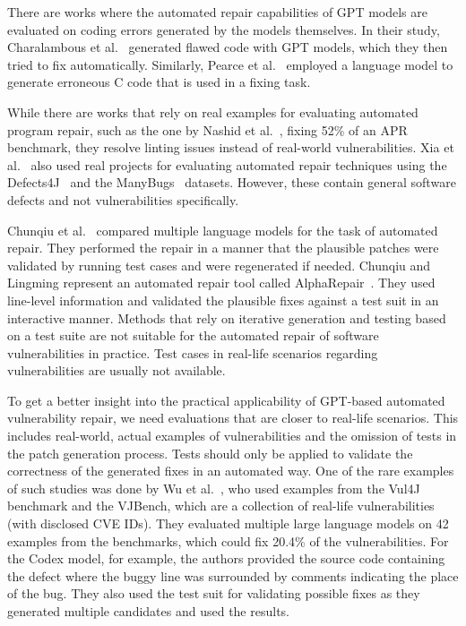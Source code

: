There are works where the automated repair capabilities of GPT models are evaluated on coding errors generated by the models themselves.
In their study, Charalambous et al.~\cite{bugs_generated} generated flawed code with GPT models, which they then tried to fix automatically.
Similarly, Pearce et al.~\cite{codex_as_fix} employed a language model to generate erroneous C code that is used in a fixing task.

While there are works that rely on real examples for evaluating automated program repair, such as the one by Nashid et al.~\cite{real_examples_linting}, fixing 52\% of an APR benchmark, they resolve linting issues instead of real-world vulnerabilities.
Xia et al.~\cite{shared_common_data} also used real projects for evaluating automated repair techniques using the Defects4J~\cite{defects4j} and the ManyBugs~\cite{many_bugs} datasets.
However, these contain general software defects and not vulnerabilities specifically.

Chunqiu et al.~\cite{conversational_bug_fix_1} compared multiple language models for the task of automated repair.
They performed the repair in a manner that the plausible patches were validated by running test cases and were regenerated if needed.
Chunqiu and Lingming represent an automated repair tool called AlphaRepair~\cite{line_level_testcase}.
They used line-level information and validated the plausible fixes against a test suit in an interactive manner.
Methods that rely on iterative generation and testing based on a test suite are not suitable for the automated repair of software vulnerabilities in practice.
Test cases in real-life scenarios regarding vulnerabilities are usually not available.

To get a better insight into the practical applicability of GPT-based automated vulnerability repair, we need evaluations that are closer to real-life scenarios.
This includes real-world, actual examples of vulnerabilities and the omission of tests in the patch generation process.
Tests should only be applied to validate the correctness of the generated fixes in an automated way.
One of the rare examples of such studies was done by Wu et al.~\cite{same_as_us_but_too_much_hint}, who used examples from the Vul4J~\cite{vul4j} benchmark and the VJBench, which are a collection of real-life vulnerabilities (with disclosed CVE IDs).
They evaluated multiple large language models on 42 examples from the benchmarks, which could fix 20.4\% of the vulnerabilities.
For the Codex model, for example, the authors provided the source code containing the defect where the buggy line was surrounded by comments indicating the place of the bug.
They also used the test suit for validating possible fixes as they generated multiple candidates and used the  results.

